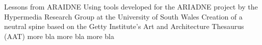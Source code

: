 \documentclass[xcolor=x11names, aspectratio=169,usenames,dvipsnames]{beamer}
\begin{document}
\begin{frame}{Lessons from ARAIDNE}
Using tools developed for the ARIADNE project by the Hypermedia Research Group at the University of South Wales \hfill{}\newline
Creation of a neutral spine based on the Getty Institute's Art and Architecture Thesaurus (AAT)\newline
more bla\newline
more bla\newline
more bla\newline
\end{frame}

\maketitle
\end{document}
